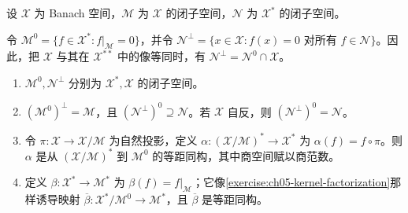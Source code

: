 \documentclass[../../main.tex]{subfiles}
\begin{document}
\begin{exercise}\label{exercise:ch05-annihilators}
设 $\mathcal X$ 为 Banach 空间，$\mathcal M$ 为 $\mathcal X$ 的闭子空间，$\mathcal N$ 为 $\mathcal X^*$ 的闭子空间。
\begin{definition*}[本题的零化子]\label{definition:ch05-annihilators}
令 $\mathcal M^0=\{f\in\mathcal X^*:f|_{\mathcal M}=0\}$，并令 $\mathcal N^\perp=\{x\in\mathcal X:f(x)=0\text{ 对所有 }f\in\mathcal N\}$。因此，把 $\mathcal X$ 与其在 $\mathcal X^{**}$ 中的像等同时，有 $\mathcal N^\perp=\mathcal N^0\cap\mathcal X$。
\end{definition*}
\begin{enumerate}
\item\label{item:ch05-annihilators-closed} $\mathcal M^0,\mathcal N^\perp$ 分别为 $\mathcal X^*,\mathcal X$ 的闭子空间。
\item\label{item:ch05-double-annihilator} $(\mathcal M^0)^\perp=\mathcal M$，且 $(\mathcal N^\perp)^0\supseteq\mathcal N$。若 $\mathcal X$ 自反，则 $(\mathcal N^\perp)^0=\mathcal N$。
\item\label{item:ch05-quotient-dual-annihilator} 令 $\pi:\mathcal X\to\mathcal X/\mathcal M$ 为自然投影，定义 $\alpha:(\mathcal X/\mathcal M)^*\to\mathcal X^*$ 为 $\alpha(f)=f\circ\pi$。则 $\alpha$ 是从 $(\mathcal X/\mathcal M)^*$ 到 $\mathcal M^0$ 的等距同构，其中商空间赋以商范数。
\item\label{item:ch05-subspace-dual-quotient} 定义 $\beta:\mathcal X^*\to\mathcal M^*$ 为 $\beta(f)=f|_{\mathcal M}$；它像\cref{exercise:ch05-kernel-factorization}那样诱导映射 $\overline\beta:\mathcal X^*/\mathcal M^0\to\mathcal M^*$，且 $\overline\beta$ 是等距同构。
\end{enumerate}
\end{exercise}
\end{document}

